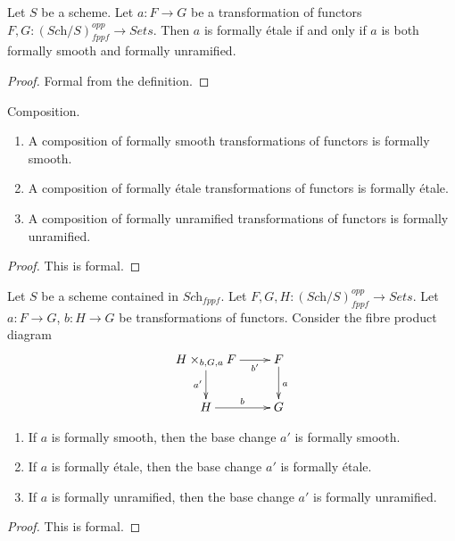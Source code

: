 \begin{lemma}
\label{lemma-formally-etale-is-combination}
Let $S$ be a scheme.
Let $a : F \to G$ be a transformation of functors
$F, G : (\textit{Sch}/S)_{fppf}^{opp} \to \textit{Sets}$.
Then $a$ is formally \'etale if and only if $a$ is both formally
smooth and formally unramified.
\end{lemma}

\begin{proof}
Formal from the definition.
\end{proof}

\begin{lemma}
\label{lemma-composition-formally-smooth-etale-unramified}
Composition.
\begin{enumerate}
\item A composition of formally smooth transformations of functors is formally
smooth.
\item A composition of formally \'etale transformations of functors is formally
\'etale.
\item A composition of formally unramified transformations of functors is
formally unramified.
\end{enumerate}
\end{lemma}

\begin{proof}
This is formal.
\end{proof}

\begin{lemma}
\label{lemma-base-change-formally-smooth-etale-unramified}
Let $S$ be a scheme contained in $\textit{Sch}_{fppf}$.
Let $F, G, H : (\textit{Sch}/S)_{fppf}^{opp} \to \textit{Sets}$.
Let $a : F \to G$, $b : H \to G$ be transformations of functors.
Consider the fibre product diagram
$$
\xymatrix{
H \times_{b, G, a} F \ar[r]_-{b'} \ar[d]_{a'} & F \ar[d]^a \\
H \ar[r]^b & G
}
$$
\begin{enumerate}
\item If $a$ is formally smooth, then the base change $a'$ is
formally smooth.
\item If $a$ is formally \'etale, then the base change $a'$ is
formally \'etale.
\item If $a$ is formally unramified, then the base change $a'$ is
formally unramified.
\end{enumerate}
\end{lemma}

\begin{proof}
This is formal.
\end{proof}

